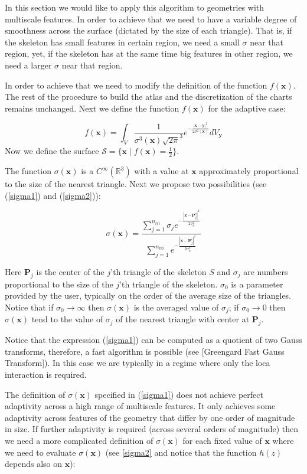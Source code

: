 \documentclass[11pt]{article}
\newcommand\bx{\boldsymbol x}
\newcommand\by{\boldsymbol y}
\newcommand\bP{\boldsymbol P}
\begin{document}
In this section we would like to apply this algorithm to geometries with multiscale features. In order to achieve that we need to have a variable degree of smoothness across the surface (dictated by the size of each triangle). That is, if the skeleton has small features in certain region, we need a small $\sigma$ near that region, yet, if the skeleton has at the same time big features in other region, we need a larger $\sigma$ near that region.

In order to achieve that we need to modify the definition of the function $f(\bx)$. The rest of the procedure to build the atlas and the discretization of the charts remains unchanged. Next we define the function $f(\bx)$ for the adaptive case:

\begin{equation}
f(\bx)=\int_{V}\frac{1}{\sigma ^3(\bx)\sqrt{2\pi}^3}e^{-\frac{|\bx-\by|^2}{2\sigma^2(\bx)}}dV_{\by}
\end{equation}
Now we define the surface $\mathcal{S}=\{\bx \mid f(\bx)=\frac{1}{2}\}$.

The function $\sigma(\bx)$ is a $C^{\infty}(\mathbb{R}^3)$ with a value at $\bx$ approximately proportional to the size of the nearest triangle. Next we propose two possibilities (see (\ref{sigma1}) and (\ref{sigma2})):

\begin{equation}\label{sigma1}
\sigma(\bx)=\frac{\sum_{j=1}^{n_{tri}}\sigma_je^{- \frac{|\bx-\bP_j^c|^2}{2\sigma^2_0}}}{\sum_{j=1}^{n_{tri}}e^{-\frac{|\bx-\bP_j^c|^2}{2\sigma^2_0}}}
\end{equation}

Here $\bP_j$ is the center of the $j$'th triangle of the skeleton $\mathit{S}$ and $\sigma_j$ are numbers proportional to the size of the $j$'th triangle of the skeleton. $\sigma_0$ is a parameter provided by the user, typically on the order of the average size of the triangles. Notice that if $\sigma_0\rightarrow \infty$ then $\sigma(\bx)$ is the averaged value of $\sigma_j$; if $\sigma_0\rightarrow 0$ then $\sigma(\bx)$ tend to the value of $\sigma_j$ of the nearest triangle with center at $\bP_j$.

Notice that the expression (\ref{sigma1}) can be computed as a quotient of two Gauss transforms, therefore, a fast algorithm is possible (see [Greengard Fast Gauss Transform]). In this case we are typically in a regime where only the loca interaction is required.

The definition of $\sigma(\bx)$ specified in (\ref{sigma1}) does not achieve perfect adaptivity across a high range of multiscale features. It only achieves some adaptivity across features of the geometry that differ by one order of magnitude in size. If further adaptivity is required (across several orders of magnitude) then we need a more complicated definition of $\sigma(\bx)$ for each fixed value of $\bx$ where we need to evaluate $\sigma(\bx)$ (see \ref{sigma2} and notice that the function $h(z)$ depends also on $\bx$):
\end{document}
